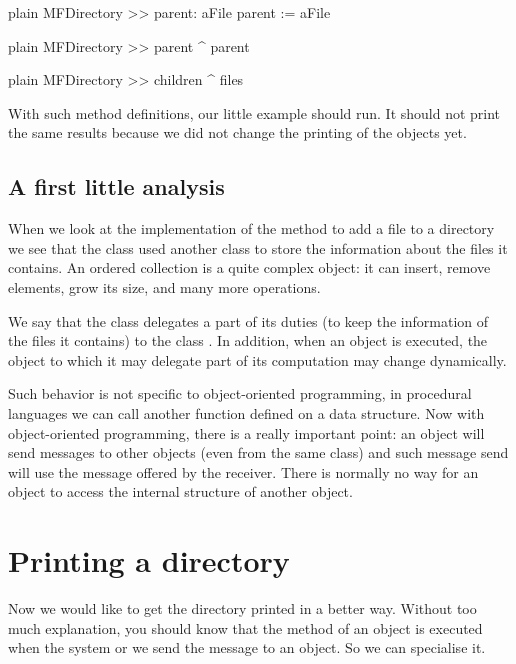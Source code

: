 \documentclass[10pt,twoside,english]{_support/latex/sbabook/sbabook}
\begin{document}
\begin{displaycode}{plain}
MFDirectory >> parent: aFile
	parent := aFile
\end{displaycode}

\begin{displaycode}{plain}
MFDirectory >> parent
	^ parent
\end{displaycode}

\begin{displaycode}{plain}
MFDirectory >> children
	^ files
\end{displaycode}

With such method definitions, our little example should run. It should not print the same results because we did not change the printing of the objects yet. 
\subsection{A first little analysis}
When we look at the implementation of the method to add a file to a directory we see that the class  used another class  to store the information about the files it contains. An ordered collection is a quite complex object: it can insert, remove elements, grow its size, and many more operations. 

We say that the class  delegates a part of its duties (to keep the information of the files it contains) to the class . In addition, when an object is executed, the object to which it may delegate part of its computation may change dynamically. 

Such behavior is not specific to object-oriented programming, in procedural languages we can call another function defined on a data structure. 
Now with object-oriented programming, there is a really important point: an object will send messages to other objects (even from the same class) and such message send will use the message offered by the receiver. There is normally no way for an object to access the internal structure of another object.
\section{Printing a directory}
Now we would like to get the directory printed in a better way. Without too much explanation, you should know that the method  of an object is executed when the system or we send the message  to an object. So we can specialise it. 
\end{document}
